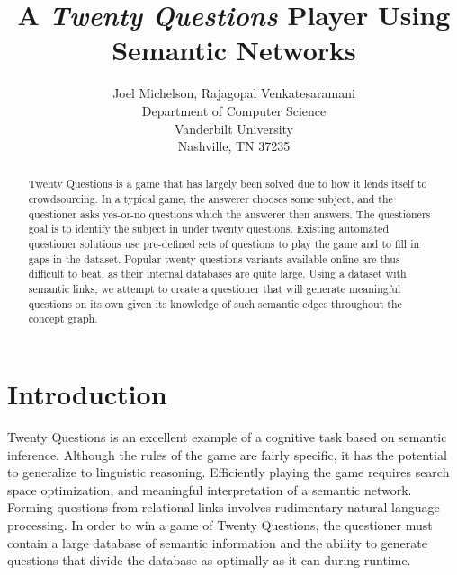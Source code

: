 \documentclass[letterpaper]{article} %
\begin{document}
%
\nocopyright

\title{A \textit{Twenty Questions} Player Using Semantic Networks}
\author{Joel Michelson, Rajagopal Venkatesaramani\\
Department of Computer Science\\
Vanderbilt University\\
Nashville, TN 37235\\
}

\maketitle

\begin{abstract}
	Twenty Questions is a game that has largely been solved due to how it lends itself to crowdsourcing. In a typical game, the answerer chooses some subject, and the questioner asks yes-or-no questions which the answerer then answers. The questioners goal is to identify the subject in under twenty questions. Existing automated questioner solutions use pre-defined sets of questions to play the game and to fill in gaps in the dataset. Popular twenty questions variants available online are thus difficult to beat, as their internal databases are quite large. Using a dataset with semantic links, we attempt to create a questioner that will generate meaningful questions on its own given its knowledge of such semantic edges throughout the concept graph. 
\end{abstract}

\section{Introduction}
Twenty Questions is an excellent example of a cognitive task based on semantic inference. Although the rules of the game are fairly specific, it has the potential to generalize to linguistic reasoning. Efficiently playing the game requires search space optimization, and meaningful interpretation of a semantic network. Forming questions from relational links involves rudimentary natural language processing. In order to win a game of Twenty Questions, the questioner must contain a large database of semantic information and the ability to generate questions that divide the database as optimally as it can during runtime.\\
\end{document}
